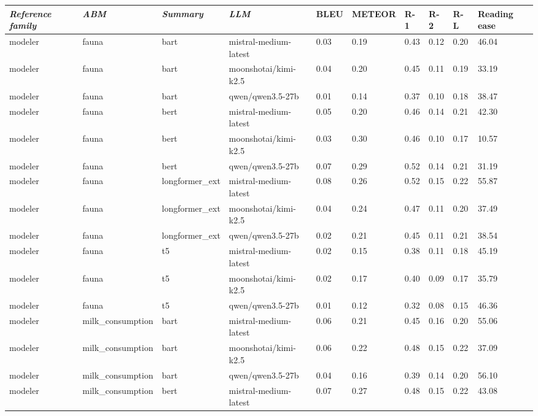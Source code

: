 \begin{tabular}{|l|l|l|l|l|l|l|l|l|l|}
\hline
\textit{\textbf{Reference family}} & \textit{\textbf{ABM}} & \textit{\textbf{Summary}} & \textit{\textbf{LLM}} & BLEU & METEOR & R-1 & R-2 & R-L & Reading ease \\
 \hline
 modeler & fauna & bart & mistral-medium-latest & 0.03 & 0.19 & 0.43 & 0.12 & 0.20 & 46.04 \\
 \hline
 modeler & fauna & bart & moonshotai/kimi-k2.5 & 0.04 & 0.20 & 0.45 & 0.11 & 0.19 & 33.19 \\
 \hline
 modeler & fauna & bart & qwen/qwen3.5-27b & 0.01 & 0.14 & 0.37 & 0.10 & 0.18 & 38.47 \\
 \hline
 modeler & fauna & bert & mistral-medium-latest & 0.05 & 0.20 & 0.46 & 0.14 & 0.21 & 42.30 \\
 \hline
 modeler & fauna & bert & moonshotai/kimi-k2.5 & 0.03 & 0.30 & 0.46 & 0.10 & 0.17 & 10.57 \\
 \hline
 modeler & fauna & bert & qwen/qwen3.5-27b & 0.07 & 0.29 & 0.52 & 0.14 & 0.21 & 31.19 \\
 \hline
 modeler & fauna & longformer\_ext & mistral-medium-latest & 0.08 & 0.26 & 0.52 & 0.15 & 0.22 & 55.87 \\
 \hline
 modeler & fauna & longformer\_ext & moonshotai/kimi-k2.5 & 0.04 & 0.24 & 0.47 & 0.11 & 0.20 & 37.49 \\
 \hline
 modeler & fauna & longformer\_ext & qwen/qwen3.5-27b & 0.02 & 0.21 & 0.45 & 0.11 & 0.21 & 38.54 \\
 \hline
 modeler & fauna & t5 & mistral-medium-latest & 0.02 & 0.15 & 0.38 & 0.11 & 0.18 & 45.19 \\
 \hline
 modeler & fauna & t5 & moonshotai/kimi-k2.5 & 0.02 & 0.17 & 0.40 & 0.09 & 0.17 & 35.79 \\
 \hline
 modeler & fauna & t5 & qwen/qwen3.5-27b & 0.01 & 0.12 & 0.32 & 0.08 & 0.15 & 46.36 \\
 \hline
 modeler & milk\_consumption & bart & mistral-medium-latest & 0.06 & 0.21 & 0.45 & 0.16 & 0.20 & 55.06 \\
 \hline
 modeler & milk\_consumption & bart & moonshotai/kimi-k2.5 & 0.06 & 0.22 & 0.48 & 0.15 & 0.22 & 37.09 \\
 \hline
 modeler & milk\_consumption & bart & qwen/qwen3.5-27b & 0.04 & 0.16 & 0.39 & 0.14 & 0.20 & 56.10 \\
 \hline
 modeler & milk\_consumption & bert & mistral-medium-latest & 0.07 & 0.27 & 0.48 & 0.15 & 0.22 & 43.08 \\

\end{tabular}
